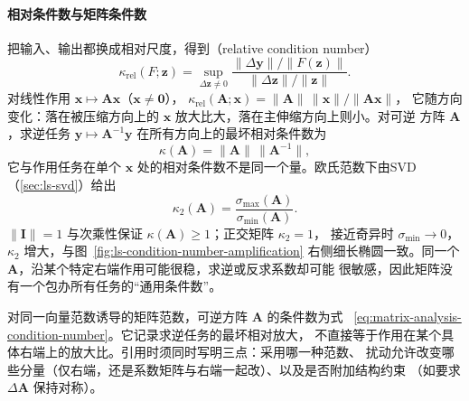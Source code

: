 \paragraph{相对条件数与矩阵条件数}

把输入、输出都换成相对尺度，得到（relative condition number）
\[
 \kappa_{\mathrm{rel}}(F;\bm z)
 =\sup_{\Delta\bm z\neq0}
 \frac{\lVert\Delta\bm y\rVert/\lVert F(\bm z)\rVert}
      {\lVert\Delta\bm z\rVert/\lVert\bm z\rVert}.
\]
对线性作用 $\bm x\mapsto\bm A\bm x$（$\bm x\neq\bm0$），
$\kappa_{\mathrm{rel}}(\bm A;\bm x)=\lVert\bm A\rVert\,\lVert\bm x\rVert/\lVert\bm A\bm x\rVert$，
它随方向变化：落在被压缩方向上的 $\bm x$ 放大比大，落在主伸缩方向上则小。对可逆
方阵 $\bm A$，求逆任务 $\bm y\mapsto\bm A^{-1}\bm y$ 在所有方向上的最坏相对条件数为
\begin{equation}
 \kappa(\bm A)=\lVert\bm A\rVert\,\lVert\bm A^{-1}\rVert,
 \label{eq:matrix-analysis-condition-number}
\end{equation}
它与作用任务在单个 $\bm x$ 处的相对条件数不是同一个量。欧氏范数下由SVD
（\ref{sec:ls-svd}）给出
\begin{equation}
 \kappa_2(\bm A)=\frac{\sigma_{\max}(\bm A)}{\sigma_{\min}(\bm A)}.
 \label{eq:matrix-analysis-spectral-condition-number}
\end{equation}
$\lVert\bm I\rVert=1$ 与次乘性保证 $\kappa(\bm A)\geq1$；正交矩阵 $\kappa_2=1$，
接近奇异时 $\sigma_{\min}\to0$，$\kappa_2$ 增大，与图~\ref{fig:ls-condition-number-amplification}
右侧细长椭圆一致。同一个 $\bm A$，沿某个特定右端作用可能很稳，求逆或反求系数却可能
很敏感，因此矩阵没有一个包办所有任务的“通用条件数”。

\begin{definition}[可逆矩阵的条件数]
\label{def:matrix-analysis-condition-number}
对同一向量范数诱导的矩阵范数，可逆方阵 $\bm A$ 的条件数为式
~\eqref{eq:matrix-analysis-condition-number}。它记录求逆任务的最坏相对放大，
不直接等于作用在某个具体右端上的放大比。引用时须同时写明三点：采用哪一种范数、
扰动允许改变哪些分量（仅右端，还是系数矩阵与右端一起改）、以及是否附加结构约束
（如要求 $\Delta\bm A$ 保持对称）。
\end{definition}

